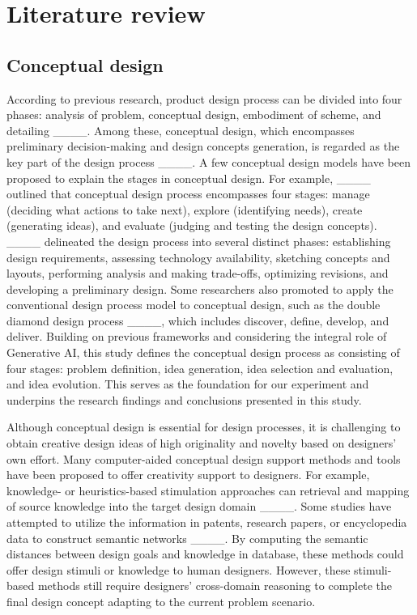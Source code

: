 \section{Literature review}
\subsection{Conceptual design}

According to previous research, product design process can be divided into four phases: analysis of problem, conceptual design, embodiment of scheme, and detailing ____. Among these, conceptual design, which encompasses preliminary decision-making and design concepts generation, is regarded as the key part of the design process ____. A few conceptual design models have been proposed to explain the stages in conceptual design. For example, ____ outlined that conceptual design process encompasses four stages: manage (deciding what actions to take next), explore (identifying needs), create (generating ideas), and evaluate (judging and testing the design concepts). ____ delineated the design process into several distinct phases: establishing design requirements, assessing technology availability, sketching concepts and layouts, performing analysis and making trade-offs, optimizing revisions, and developing a preliminary design. Some researchers also promoted to apply the conventional design process model to conceptual design, such as the double diamond design process ____, which includes discover, define, develop, and deliver. Building on previous frameworks and considering the integral role of Generative AI, this study defines the conceptual design process as consisting of four stages: problem definition, idea generation, idea selection and evaluation, and idea evolution. This serves as the foundation for our experiment and underpins the research findings and conclusions presented in this study.

Although conceptual design is essential for design processes, it is challenging to obtain creative design ideas of high originality and novelty based on designers' own effort. Many computer-aided conceptual design support methods and tools have been proposed to offer creativity support to designers. For example, knowledge- or heuristics-based stimulation approaches can retrieval and mapping of source knowledge into the target design domain ____. Some studies have attempted to utilize the information in patents, research papers, or encyclopedia data to construct semantic networks ____. By computing the semantic distances between design goals and knowledge in database, these methods could offer design stimuli or knowledge to human designers. However, these stimuli-based methods still require designers' cross-domain reasoning to complete the final design concept adapting to the current problem scenario.

